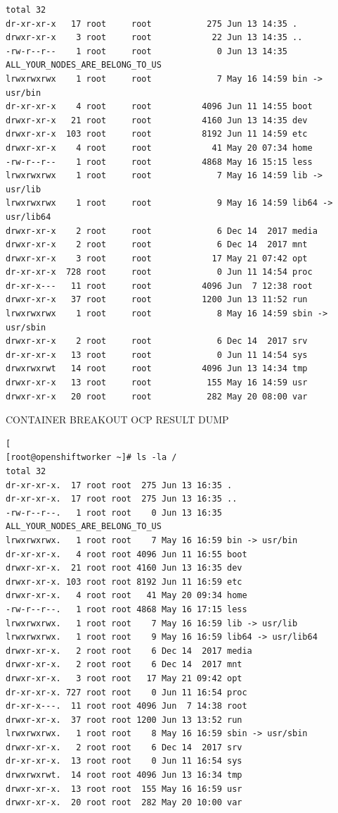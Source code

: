 \begin{lstlisting}
total 32
dr-xr-xr-x   17 root     root           275 Jun 13 14:35 .
drwxr-xr-x    3 root     root            22 Jun 13 14:35 ..
-rw-r--r--    1 root     root             0 Jun 13 14:35 ALL_YOUR_NODES_ARE_BELONG_TO_US
lrwxrwxrwx    1 root     root             7 May 16 14:59 bin -> usr/bin
dr-xr-xr-x    4 root     root          4096 Jun 11 14:55 boot
drwxr-xr-x   21 root     root          4160 Jun 13 14:35 dev
drwxr-xr-x  103 root     root          8192 Jun 11 14:59 etc
drwxr-xr-x    4 root     root            41 May 20 07:34 home
-rw-r--r--    1 root     root          4868 May 16 15:15 less
lrwxrwxrwx    1 root     root             7 May 16 14:59 lib -> usr/lib
lrwxrwxrwx    1 root     root             9 May 16 14:59 lib64 -> usr/lib64
drwxr-xr-x    2 root     root             6 Dec 14  2017 media
drwxr-xr-x    2 root     root             6 Dec 14  2017 mnt
drwxr-xr-x    3 root     root            17 May 21 07:42 opt
dr-xr-xr-x  728 root     root             0 Jun 11 14:54 proc
dr-xr-x---   11 root     root          4096 Jun  7 12:38 root
drwxr-xr-x   37 root     root          1200 Jun 13 11:52 run
lrwxrwxrwx    1 root     root             8 May 16 14:59 sbin -> usr/sbin
drwxr-xr-x    2 root     root             6 Dec 14  2017 srv
dr-xr-xr-x   13 root     root             0 Jun 11 14:54 sys
drwxrwxrwt   14 root     root          4096 Jun 13 14:34 tmp
drwxr-xr-x   13 root     root           155 May 16 14:59 usr
drwxr-xr-x   20 root     root           282 May 20 08:00 var
\end{lstlisting}
\fi
CONTAINER BREAKOUT OCP RESULT DUMP
\iffalse
\begin{lstlisting}[
[root@openshiftworker ~]# ls -la /
total 32
dr-xr-xr-x.  17 root root  275 Jun 13 16:35 .
dr-xr-xr-x.  17 root root  275 Jun 13 16:35 ..
-rw-r--r--.   1 root root    0 Jun 13 16:35 ALL_YOUR_NODES_ARE_BELONG_TO_US
lrwxrwxrwx.   1 root root    7 May 16 16:59 bin -> usr/bin
dr-xr-xr-x.   4 root root 4096 Jun 11 16:55 boot
drwxr-xr-x.  21 root root 4160 Jun 13 16:35 dev
drwxr-xr-x. 103 root root 8192 Jun 11 16:59 etc
drwxr-xr-x.   4 root root   41 May 20 09:34 home
-rw-r--r--.   1 root root 4868 May 16 17:15 less
lrwxrwxrwx.   1 root root    7 May 16 16:59 lib -> usr/lib
lrwxrwxrwx.   1 root root    9 May 16 16:59 lib64 -> usr/lib64
drwxr-xr-x.   2 root root    6 Dec 14  2017 media
drwxr-xr-x.   2 root root    6 Dec 14  2017 mnt
drwxr-xr-x.   3 root root   17 May 21 09:42 opt
dr-xr-xr-x. 727 root root    0 Jun 11 16:54 proc
dr-xr-x---.  11 root root 4096 Jun  7 14:38 root
drwxr-xr-x.  37 root root 1200 Jun 13 13:52 run
lrwxrwxrwx.   1 root root    8 May 16 16:59 sbin -> usr/sbin
drwxr-xr-x.   2 root root    6 Dec 14  2017 srv
dr-xr-xr-x.  13 root root    0 Jun 11 16:54 sys
drwxrwxrwt.  14 root root 4096 Jun 13 16:34 tmp
drwxr-xr-x.  13 root root  155 May 16 16:59 usr
drwxr-xr-x.  20 root root  282 May 20 10:00 var
\end{lstlisting}
